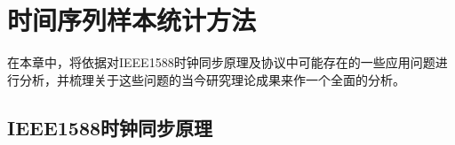 
\chapter{时间序列样本统计方法}
\label{chap:1588_theory}
在本章中，将依据对IEEE1588时钟同步原理及协议中可能存在的一些应用问题进行分析，并梳理关于这些问题的当今研究理论成果来作一个全面的分析。

\section{IEEE1588时钟同步原理}






